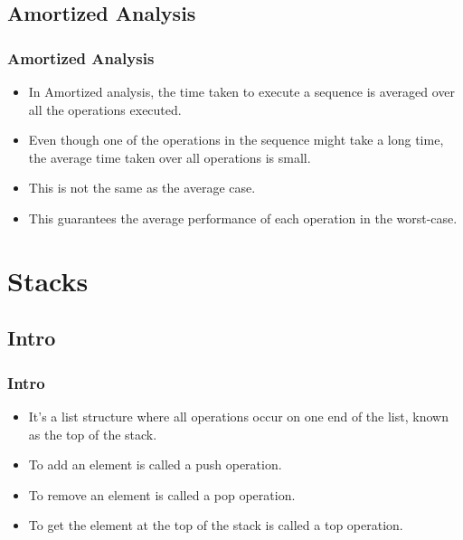 \documentclass{beamer}
\begin{document}
\subsection{Amortized Analysis}
\begin{frame}
\frametitle{Amortized Analysis}
\begin{itemize}
\item In {\color{green} Amortized analysis}, the time taken to execute a sequence is averaged over all the operations executed.
\item Even though one of the operations in the sequence might take a long time, the average time taken over all operations is small.
\item This is not the same as the average case.
\item This guarantees the average performance of each operation in the worst-case.
\end{itemize}
\end{frame}

\section{Stacks}
\subsection{Intro}
\begin{frame}
\frametitle{Intro}
\begin{itemize}
\item It's a list structure where all operations occur on one end of the list, known as the {\color{green} top of the stack}.
\item To add an element is called a {\color{red} push} operation.
\item To remove an element is called a {\color{purple} pop} operation.
\item To get the element at the {\color{green} top of the stack} is called a {\color{orange} top} operation. 
\end{itemize}
\end{frame}

\end{document}
